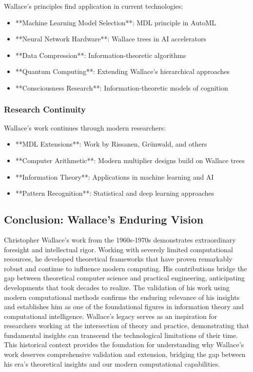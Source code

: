 Wallace's principles find application in current technologies:

\begin{itemize}
    \item **Machine Learning Model Selection**: MDL principle in AutoML
    \item **Neural Network Hardware**: Wallace trees in AI accelerators
    \item **Data Compression**: Information-theoretic algorithms
    \item **Quantum Computing**: Extending Wallace's hierarchical approaches
    \item **Consciousness Research**: Information-theoretic models of cognition
\end{itemize}

\subsubsection{Research Continuity}

Wallace's work continues through modern researchers:

\begin{itemize}
    \item **MDL Extensions**: Work by Rissanen, Grünwald, and others
    \item **Computer Arithmetic**: Modern multiplier designs build on Wallace trees
    \item **Information Theory**: Applications in machine learning and AI
    \item **Pattern Recognition**: Statistical and deep learning approaches
\end{itemize}

\subsection{Conclusion: Wallace's Enduring Vision}

Christopher Wallace's work from the 1960s-1970s demonstrates extraordinary foresight and intellectual rigor. Working with severely limited computational resources, he developed theoretical frameworks that have proven remarkably robust and continue to influence modern computing. His contributions bridge the gap between theoretical computer science and practical engineering, anticipating developments that took decades to realize. The validation of his work using modern computational methods confirms the enduring relevance of his insights and establishes him as one of the foundational figures in information theory and computational intelligence. Wallace's legacy serves as an inspiration for researchers working at the intersection of theory and practice, demonstrating that fundamental insights can transcend the technological limitations of their time. This historical context provides the foundation for understanding why Wallace's work deserves comprehensive validation and extension, bridging the gap between his era's theoretical insights and our modern computational capabilities.
